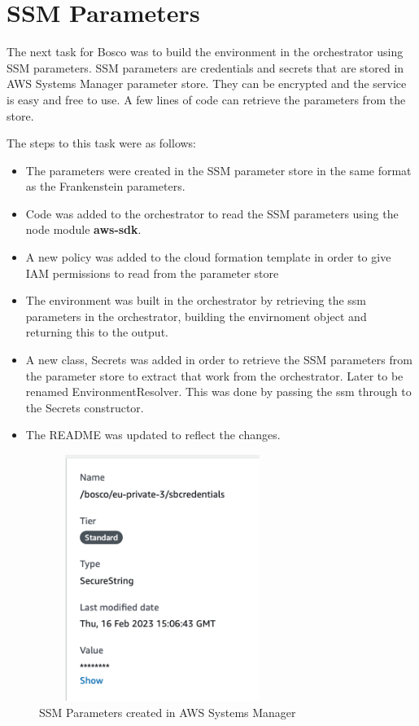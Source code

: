 \documentclass[12pt,a4paper,titlepage]{report}
\begin{document}
\section{SSM Parameters}
The next task for Bosco was to build the environment in the orchestrator using SSM parameters. 
SSM parameters are credentials and secrets that are stored in AWS Systems Manager parameter store. 
They can be encrypted and the service is easy and free to use. A few lines of code can retrieve the parameters from the store. 

The steps to this task were as follows:
\begin{itemize}
\item The parameters were created in the SSM parameter store in the same format as the Frankenstein parameters.
\item Code was added to the orchestrator to read the SSM parameters using the node module \textbf{aws-sdk}.
\item A new policy was added to the cloud formation template in order to give IAM permissions to read from the parameter store
\item The environment was built in the orchestrator by retrieving the ssm parameters in the orchestrator, building the envirnoment object and returning this to the output.
\item A new class, Secrets was added in order to retrieve the SSM parameters from the parameter store to extract that work from the orchestrator. Later to be renamed EnvironmentResolver. This was done by passing the ssm through to the Secrets constructor.
\item The README was updated to reflect the changes.
\end{itemize}

\begin{figure}[h]
 \centering
 \includegraphics[width=8cm,height=8cm,keepaspectratio]{./diagrams/ssm_params.png}
 \caption{SSM Parameters created in AWS Systems Manager}
\end{figure}
\end{document}
